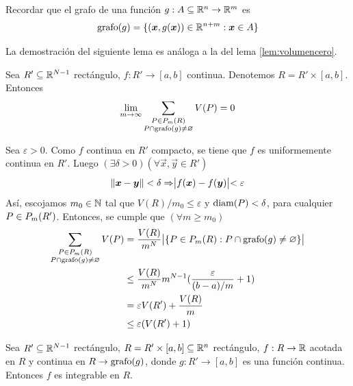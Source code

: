 Recordar que el grafo de una funci\'on $ g: A \subseteq \mathbb{R}^n \to
\mathbb{R}^m $ es
    \[ \operatorname{grafo}(g) = \{ (\boldsymbol{x},g(\boldsymbol{x})) \in \mathbb{R}^{n+m} :  \boldsymbol{x} \in A\} \]

La demostraci\'on del siguiente lema es an\'aloga a la del lema \ref{lem:volumencero}.

\begin{lema} %
Sea  $ R' \subseteq \mathbb{R}^{N-1} $ rect\'angulo, $ f: R' \to [a,b] $
continua. Denotemos $ R = R' \times [a,b] $. Entonces
    \[ \lim_{m \to \infty} \sum_{\substack{P \in P_{m}(R) \\ P \cap
    \operatorname{grafo}(g) \neq \varnothing}} V(P) = 0 \]
\end{lema}

\begin{demostracion}
Sea $\varepsilon > 0 $. Como $ f $ continua en $ R' $ compacto, se tiene que $ f $ es uniformemente continua en $ R' $. Luego $(\exists \delta > 0) (\forall \vec{x},\vec{y} \in R') $
    \[ \lVert\boldsymbol{x}-\boldsymbol{y}\rVert<\delta \Rightarrow \bigr\lvert f(\boldsymbol{x})-f(\boldsymbol{y})\bigl\rvert < \varepsilon \]
As\'i, escojamos $m_0\in \mathbb{N}$ tal que $ V(R)/m_0 \leq \varepsilon $ y $ \operatorname{diam}(P) < \delta $, para cualquier $ P \in P_{m}(R') $. Entonces, se cumple que $ (\forall m \geq m_0 ) $
\begin{align*}
\sum_{\substack{P \in \ep{m}{R} \\ P \cap \grafo(g) \neq
\varnothing}} V(P)
    &= \frac{V(R)}{m^N} \card{\{ P \in \ep{m}{R} : P \cap
    \grafo(g) \neq \varnothing \}} \\
    &\leq \frac{V(R)}{m^N} m^{N-1} (\frac{\varepsilon}{(b-a)/m} + 1) \\ %
    &= \varepsilon V(R') + \frac{V(R)}{m} \\
    &\leq \varepsilon (V(R') +1)
\end{align*}
\end{demostracion}

\begin{proposicion}
Sea $ R' \subseteq \mathbb{R}^{N-1}$ rect\'angulo, $ R = R' \times [a,b] \subseteq \mathbb{R}^n $ rec\-t\'an\-gu\-lo, $ f:R \to \mathbb{R} $ acotada en $R$ y continua en $ R \rightarrow \operatorname{grafo}(g) $, donde $ g: R' \to [a,b] $ es una funci\'on continua. Entonces $ f $ es integrable en $ R $.
\end{proposicion}


